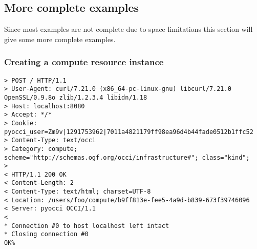\documentclass[10pt,a4paper]{article}
\begin{document}

\subsection{More complete examples}
Since most examples are not complete due to space limitations this
section will give some more complete examples.

\subsubsection{Creating a compute resource instance}
\begin{verbatim}
> POST / HTTP/1.1
> User-Agent: curl/7.21.0 (x86_64-pc-linux-gnu) libcurl/7.21.0 OpenSSL/0.9.8o zlib/1.2.3.4 libidn/1.18
> Host: localhost:8080
> Accept: */*
> Cookie: pyocci_user=Zm9v|1291753962|7011a4821179ff98ea96d4b44fade0512b1ffc52
> Content-Type: text/occi
> Category: compute; scheme="http://schemas.ogf.org/occi/infrastructure#"; class="kind";
> 
< HTTP/1.1 200 OK
< Content-Length: 2
< Content-Type: text/html; charset=UTF-8
< Location: /users/foo/compute/b9ff813e-fee5-4a9d-b839-673f39746096
< Server: pyocci OCCI/1.1
< 
* Connection #0 to host localhost left intact
* Closing connection #0
OK% 
\end{verbatim}
\end{document}
